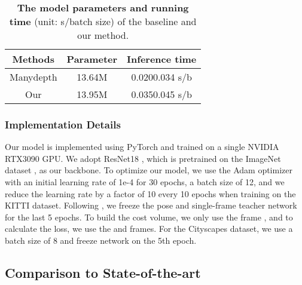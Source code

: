 \documentclass[journal]{IEEEtran}
\begin{document}
\begin{table}
\centering
\caption{\textbf{The model parameters and running time} (unit: s/batch size) of the baseline and our method.}
\label{tab:6}
\begin{tabular}{ccc}
\hline
Methods   & Parameter & Inference time      \\ \hline
Manydepth\cite{manydepth} & 13.64M    & 0.0200.034 s/b \\
Our       & 13.95M    & 0.0350.045 s/b \\ \hline
\end{tabular}
\end{table}



\subsubsection{Implementation Details}
Our model is implemented using PyTorch and trained on a single NVIDIA RTX3090 GPU. We adopt ResNet18 \cite{he2016deep}, which is pretrained on the ImageNet dataset \cite{deng2009imagenet}, as our backbone. To optimize our model, we use the Adam optimizer \cite{kingma2014adam} with an initial learning rate of 1e-4 for 30 epochs, a batch size of 12, and we reduce the learning rate by a factor of 10 every 10 epochs when training on the KITTI dataset. Following \cite{manydepth}, we freeze the pose and single-frame teacher network for the last 5 epochs. To build the cost volume, we only use the frame , and to calculate the loss, we use the  and  frames. For the Cityscapes dataset, we use a batch size of 8 and freeze network on the 5th epoch.

\subsection{Comparison to State-of-the-art}
\end{document}
